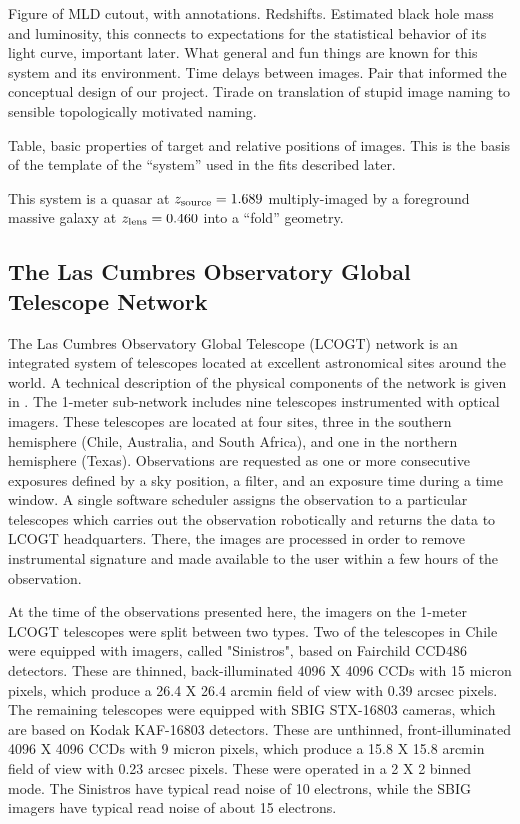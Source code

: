 \documentclass[iop]{emulateapj}
\begin{document}
Figure of MLD cutout, with annotations.  Redshifts.  Estimated black
hole mass and luminosity, this connects to expectations for the
statistical behavior of its light curve, important later.  What general and
fun things are known for this system and its environment.  Time delays between
images. Pair that informed the conceptual design of our project.
Tirade on translation of stupid image naming to sensible topologically
motivated naming.  

Table, basic properties of target and relative positions of
images. This is the basis of the template of the ``system'' used in
the fits described later. 

This system is a quasar at $z_{\rm source}=1.689$ multiply-imaged by a
foreground massive galaxy at $z_{\rm lens}=0.460$ into a ``fold''
geometry.  



\subsection{The Las Cumbres Observatory Global Telescope Network}


The Las Cumbres Observatory Global Telescope (LCOGT) network is an
integrated system of telescopes located at excellent astronomical
sites around the world.  A technical description of the physical
components of the network is given in \citep{brown13}. The 1-meter
sub-network includes nine telescopes instrumented with optical imagers.
These telescopes are located at four sites, three in the southern
hemisphere (Chile, Australia, and South Africa), and one in the
northern hemisphere (Texas).  Observations are requested as one or
more consecutive exposures defined by a sky position, a filter, and an
exposure time during a time window.  A single software scheduler
assigns the observation to a particular telescopes which carries out
the observation robotically and returns the data to LCOGT
headquarters. There, the images are processed in order to remove
instrumental signature and made available to the user within a few
hours of the observation.

At the time of the observations presented here, the imagers on the
1-meter LCOGT telescopes were split between two types.  Two of the
telescopes in Chile were equipped with imagers, called "Sinistros",
based on Fairchild CCD486 detectors.  These are thinned,
back-illuminated 4096 X 4096 CCDs with 15 micron pixels, which produce
a 26.4 X 26.4 arcmin field of view with 0.39 arcsec pixels.  The
remaining telescopes were equipped with SBIG STX-16803 cameras, which
are based on Kodak KAF-16803 detectors.  These are unthinned,
front-illuminated 4096 X 4096 CCDs with 9 micron pixels, which produce
a 15.8 X 15.8 arcmin field of view with 0.23 arcsec pixels.  These
were operated in a 2 X 2 binned mode.  The Sinistros have typical read
noise of 10 electrons, while the SBIG imagers have typical read noise
of about 15 electrons.
\end{document}
